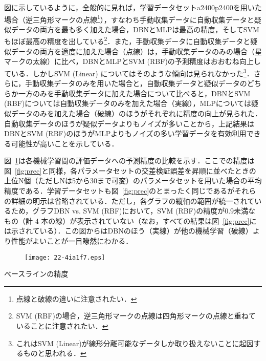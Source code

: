 \documentclass[japanese]{jnlp_1.4}
\begin{document}
図に示しているように，全般的に見れば，学習データセットa2400p2400を用いた場合（逆三角形マークの点線\footnote{点線と破線の違いに注意されたい．}），すなわち手動収集データに自動収集データと疑似データの両方を最も多く加えた場合，DBNとMLPは最高の精度，そしてSVMもほぼ最高の精度を出している\footnote{SVM (RBF)の場合，逆三角形マークの点線は四角形マークの点線と重ねていることに注意されたい．}．また，手動収集データに自動収集データと疑似データの両方を適度に加えた場合（点線）は，手動収集データのみの場合（星マークの太線）に比べ，DBNとMLPとSVM  (RBF)の予測精度はおおむね向上している．しかしSVM (Linear) についてはそのような傾向は見られなかった\footnote{これはSVM  (Linear)が線形分離可能なデータしか取り扱えないことに起因するものと思われる．}．さらに，手動収集データのみを用いた場合と，自動収集データと疑似データのどちらか一方のみを手動収集データに加えた場合について比べると，DBNとSVM (RBF)については自動収集データのみを加えた場合（実線），MLPについては疑似データのみを加えた場合（破線）のほうがそれぞれに精度の向上が見られた．自動収集データのほうが疑似データよりもノイズが多いことから，上記結果はDBNとSVM (RBF)のほうがMLPよりもノイズの多い学習データを有効利用できる可能性が高いことを示している．

図~\ref{fig:cmp}は各機械学習間の評価データへの予測精度の比較を示す．ここでの精度は図~\ref{fig:prec}と同様，各パラメータセットの交差検証誤差を昇順に並べたときの上位N個（ただしNは5から30まで可変）のパラメータセットを用いた場合の平均精度である．学習データセットも図~\ref{fig:prec}のとまったく同じであるがそれらの詳細の明示は省略されている．ただし，各グラフの縦軸の範囲が統一されているため，グラフDBN vs. SVM (RBF)において，SVM (RBF)の精度が0.9未満なもの（計 4 本の線）が表示されていない（なお，すべての結果は図~\ref{fig:prec}には示されている）．この図からはDBNのほう（実線）が他の機械学習（破線）より性能がよいことが一目瞭然にわかる．

\begin{figure}[p]
\begin{center}
\texttt{[image: 22-4ia1f7.eps]}
\end{center}
\label{fig:cmp}
\end{figure}
\begin{table}[p]
\caption{ベースラインの精度}
\label{tab:baseline}

\end{table}
\end{document}
